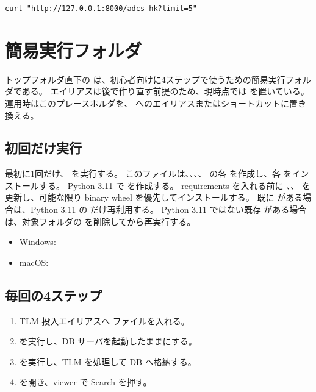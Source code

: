 \documentclass[a4paper,11pt]{ltjsarticle}
\begin{document}
\begin{verbatim}
curl "http://127.0.0.1:8000/adcs-hk?limit=5"
\end{verbatim}

\section{簡易実行フォルダ}

トップフォルダ直下の  は、初心者向けに4ステップで使うための簡易実行フォルダである。
エイリアスは後で作り直す前提のため、現時点では  を置いている。
運用時はこのプレースホルダを、 へのエイリアスまたはショートカットに置き換える。

\subsection{初回だけ実行}

最初に1回だけ、 を実行する。
このファイルは、、、、 の各  を作成し、各  をインストールする。
Python 3.11 で  を作成する。
requirements を入れる前に 、、 を更新し、可能な限り binary wheel を優先してインストールする。
既に  がある場合は、Python 3.11 の  だけ再利用する。
Python 3.11 ではない既存  がある場合は、対象フォルダの  を削除してから再実行する。

\begin{itemize}
  \item Windows: 
  \item macOS: 
\end{itemize}

\subsection{毎回の4ステップ}

\begin{enumerate}
  \item TLM 投入エイリアスへ  ファイルを入れる。
  \item {} を実行し、DB サーバを起動したままにする。
  \item {} を実行し、TLM を処理して DB へ格納する。
  \item {} を開き、viewer で Search を押す。
\end{enumerate}
\end{document}
